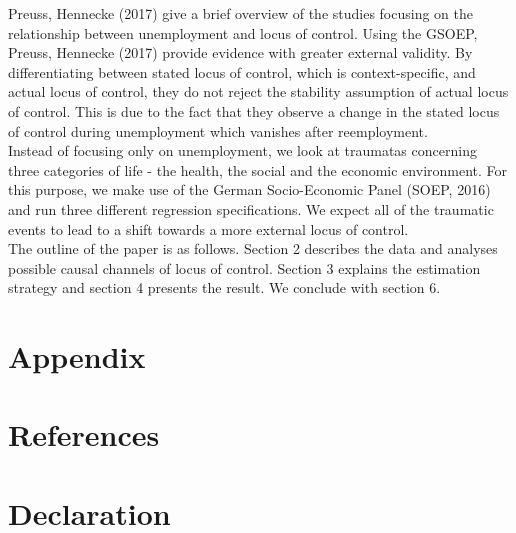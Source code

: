 \documentclass[12pt,a4paper,fleqn]{article}
\begin{document}
Preuss, Hennecke (2017) give a brief overview of the studies focusing on the relationship between unemployment and locus of control. Using the GSOEP, Preuss, Hennecke (2017) provide evidence with greater external validity. By differentiating between stated locus of control, which is context-specific, and actual locus of control, they do not reject the stability assumption of actual locus of control. This is due to the fact that they observe a change in the stated locus of control during unemployment which vanishes after reemployment. \\
Instead of focusing only on unemployment, we look at traumatas concerning three categories of life - the health, the social and the economic environment.  For this purpose, we make use of the German Socio-Economic Panel (SOEP, 2016) and run three different regression specifications. We expect all of the traumatic events to lead to a shift towards a more external locus of control.\\
The outline of the paper is as follows. Section 2 describes the data and analyses possible causal channels of locus of control. Section 3 explains the estimation strategy and section 4 presents the result. We conclude with section 6. 



\appendix
\setcounter{secnumdepth}{0}
\section{Appendix}



\pagebreak
\setcounter{secnumdepth}{0}
\section{References}


	
	
\pagebreak
\setcounter{secnumdepth}{0}
\section{Declaration}
\end{document}

